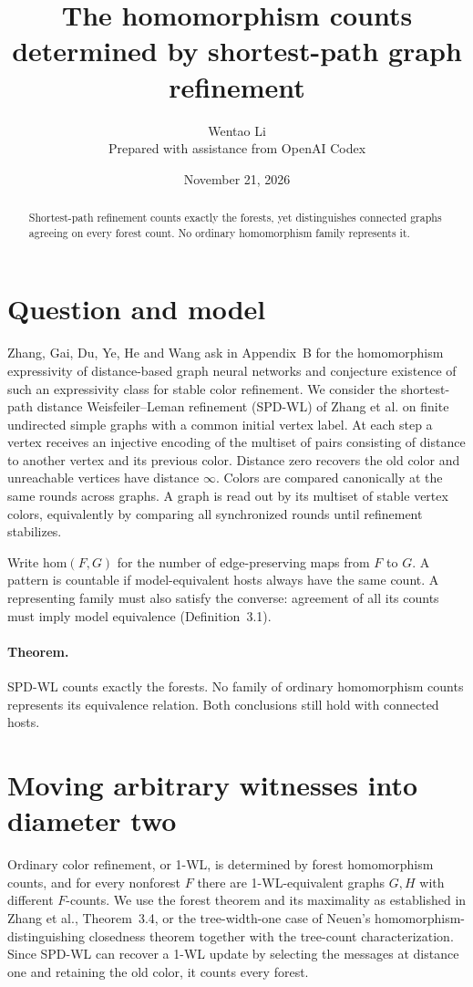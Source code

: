 \documentclass[11pt]{article}
\title{The homomorphism counts determined by shortest-path graph refinement}
\author{Wentao Li\\{\small Prepared with assistance from OpenAI Codex}}
\date{November 21, 2026}
\begin{document}
\maketitle
\begin{abstract}
Shortest-path refinement counts exactly the forests, yet distinguishes connected graphs agreeing on every forest count. No ordinary homomorphism family represents it.
\end{abstract}
\section*{Question and model}
Zhang, Gai, Du, Ye, He and Wang ask in Appendix~B for the homomorphism expressivity of distance-based graph neural networks and conjecture existence of such an expressivity class for stable color refinement. We consider the shortest-path distance Weisfeiler--Leman refinement (SPD-WL) of Zhang et al. on finite undirected simple graphs with a common initial vertex label. At each step a vertex receives an injective encoding of the multiset of pairs consisting of distance to another vertex and its previous color. Distance zero recovers the old color and unreachable vertices have distance $\infty$. Colors are compared canonically at the same rounds across graphs. A graph is read out by its multiset of stable vertex colors, equivalently by comparing all synchronized rounds until refinement stabilizes.

Write $\mathrm{hom}(F,G)$ for the number of edge-preserving maps from $F$ to $G$. A pattern is countable if model-equivalent hosts always have the same count. A representing family must also satisfy the converse: agreement of all its counts must imply model equivalence (Definition~3.1).

\paragraph{Theorem.} SPD-WL counts exactly the forests. No family of ordinary homomorphism counts represents its equivalence relation. Both conclusions still hold with connected hosts.

\section*{Moving arbitrary witnesses into diameter two}
Ordinary color refinement, or 1-WL, is determined by forest homomorphism counts, and for every nonforest $F$ there are 1-WL-equivalent graphs $G,H$ with different $F$-counts. We use the forest theorem and its maximality as established in Zhang et al., Theorem~3.4, or the tree-width-one case of Neuen's homomorphism-distinguishing closedness theorem together with the tree-count characterization. Since SPD-WL can recover a 1-WL update by selecting the messages at distance one and retaining the old color, it counts every forest.
\end{document}
